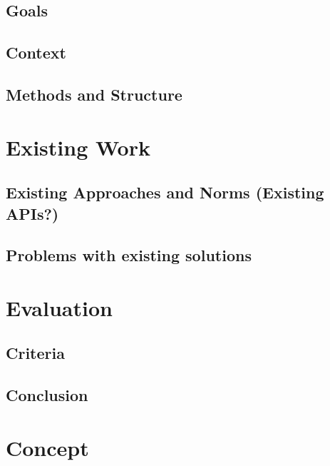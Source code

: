 \documentclass[a4paper,parskip=full]{scrreprt}
\begin{document}
\section{Goals}
\section{Context}
\section{Methods and Structure}

\chapter{Existing Work}  
\section{Existing Approaches and Norms (Existing APIs?)}
\section{Problems with existing solutions}  

\chapter{Evaluation}
\section{Criteria}
\section{Conclusion}

\chapter{Concept}
\end{document}
